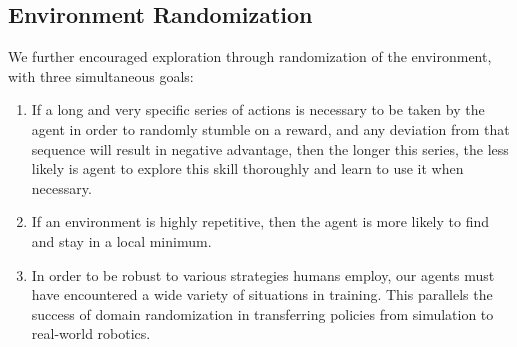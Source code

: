 \documentclass[ocean-paper.tex]{subfiles}
\begin{document}
\subsection{Environment Randomization}
\label{sec:random}
We further encouraged exploration through randomization of the environment, with three simultaneous goals:

\begin{enumerate}
\item If a long and very specific series of actions is necessary to be taken by the agent in order to randomly stumble on a reward, and any deviation from that sequence will result in negative advantage, then the longer this series, the less likely is agent to explore this skill thoroughly and learn to use it when necessary.
\item If an environment is highly repetitive, then the agent is more likely to find and stay in a local minimum.
\item In order to be robust to various strategies humans employ, our agents must have encountered a wide variety of situations in training.
This parallels the success of domain randomization in transferring policies from simulation to real-world robotics\cite{dactyl}.
\end{enumerate}
\end{document}
